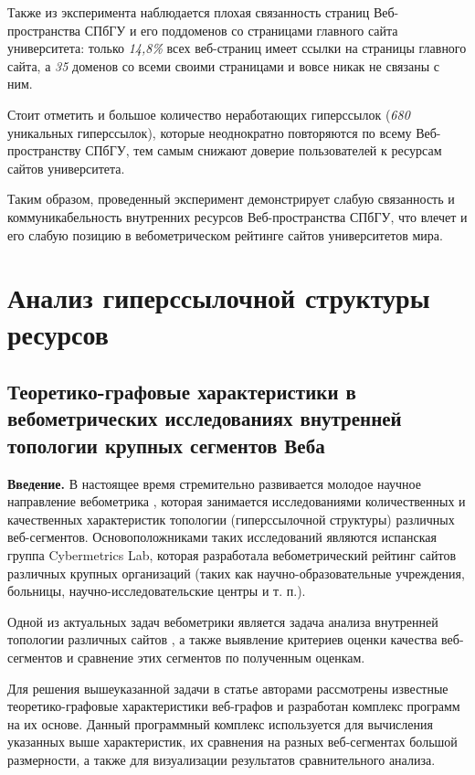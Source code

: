 Также из эксперимента наблюдается плохая связанность страниц Веб-пространства СПбГУ и его поддоменов со страницами главного сайта университета: только \textit{14,8\%} всех веб-страниц имеет ссылки на страницы главного сайта, а \textit{35} доменов со всеми своими страницами и вовсе никак не связаны с ним. 

Стоит отметить и большое количество неработающих гиперссылок (\textit{680} уникальных гиперссылок), которые неоднократно повторяются по всему Веб-пространству СПбГУ, тем самым снижают доверие пользователей к ресурсам сайтов университета. 

Таким образом, проведенный эксперимент демонстрирует слабую связанность и коммуникабельность внутренних ресурсов Веб-пространства СПбГУ, что влечет и его слабую позицию в вебометрическом рейтинге сайтов университетов мира.

\section{Анализ гиперссылочной структуры ресурсов}\label{sec:markup}

\subsection{Теоретико-графовые характеристики в вебометрических исследованиях внутренней топологии крупных сегментов Веба}\label{subsec:ch1/sec4/sub1}

\textbf{Введение.} В настоящее время стремительно развивается молодое научное направление вебометрика \cite{AlmindIngwersen,Thelwall,Pechnikov}, которая занимается исследованиями количественных и качественных характеристик топологии (гиперссылочной структуры) различных веб-сегментов. Основоположниками таких исследований являются испанская группа Cybermetrics Lab, которая разработала вебометрический рейтинг сайтов различных крупных организаций \cite{RankingWeb} (таких как научно-образовательные учреждения, больницы, научно-исследовательские центры и т. п.).  

Одной из актуальных задач вебометрики является задача анализа внутренней топологии различных сайтов \cite{Thelwall,BlekanovSergeevMaksimov,MaksimovBlekanov,BlekanovSergeevMaksimovBOWTIE}, а также выявление критериев оценки качества веб-сегментов и сравнение этих сегментов по полученным оценкам.  

Для решения вышеуказанной задачи в статье авторами рассмотрены известные теоретико-графовые характеристики веб-графов и разработан комплекс программ на их основе. Данный программный комплекс используется для вычисления указанных выше характеристик, их сравнения на разных веб-сегментах большой размерности, а также для визуализации результатов сравнительного анализа.  


